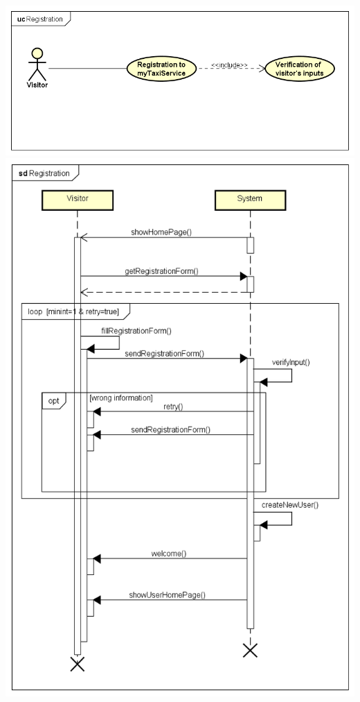 \documentclass[a4paper,11pt]{report} %
\begin{document}
	\begin{center}
		\includegraphics[width=0.9\linewidth]{Pictures/UCRegistration}
		\includegraphics[width=0.9\linewidth]{Pictures/SDRegistration}
	\end{center}
	\pagebreak	
	
\end{document}
